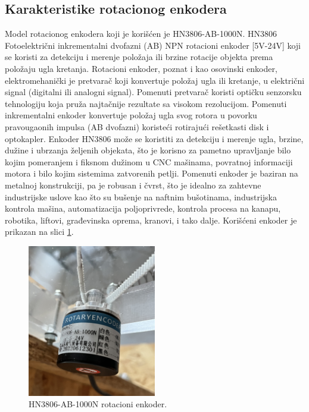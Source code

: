 \documentclass[a4paper, 12pt, diplomski]{etf}
\begin{document}
\subsection{Karakteristike rotacionog enkodera}

Model rotacionog enkodera koji je korišćen je HN3806-AB-1000N. HN3806 Fotoelektrični inkrementalni dvofazni (AB) NPN rotacioni enkoder [5V-24V] koji se koristi za detekciju i merenje položaja ili brzine rotacije objekta prema položaju ugla kretanja. Rotacioni enkoder, poznat i kao osovinski enkoder, elektromehanički je pretvarač koji konvertuje položaj ugla ili kretanje, u električni signal (digitalni ili analogni signal). Pomenuti pretvarač koristi optičku senzorsku tehnologiju koja pruža najtačnije rezultate sa visokom rezolucijom. Pomenuti inkrementalni enkoder konvertuje položaj ugla svog rotora u povorku pravougaonih impulsa (AB dvofazni) koristeći rotirajući rešetkasti disk i optokapler.
Enkoder HN3806 može se koristiti za detekciju i merenje ugla, brzine, dužine i ubrzanja željenih objekata, što je korisno za pametno upravljanje bilo kojim pomeranjem i fiksnom dužinom u CNC mašinama, povratnoj informaciji motora i bilo kojim sistemima zatvorenih petlji. Pomenuti enkoder je baziran na metalnoj konstrukciji, pa je robusan i čvrst, što je idealno za zahtevne industrijske uslove kao što su bušenje na naftnim bušotinama, industrijska kontrola mašina, automatizacija poljoprivrede, kontrola procesa na kanapu, robotika, liftovi, građevinska oprema, kranovi, i tako dalje. Korišćeni enkoder je prikazan na slici \ref{enc2}. 


\begin{figure}[h!]
    \centering
    \includegraphics[angle=0,width=0.5\textwidth]{imgs_real/enc2.jpeg}
    \caption{HN3806-AB-1000N rotacioni enkoder.}
    \label{enc2}
\end{figure}
\end{document}
